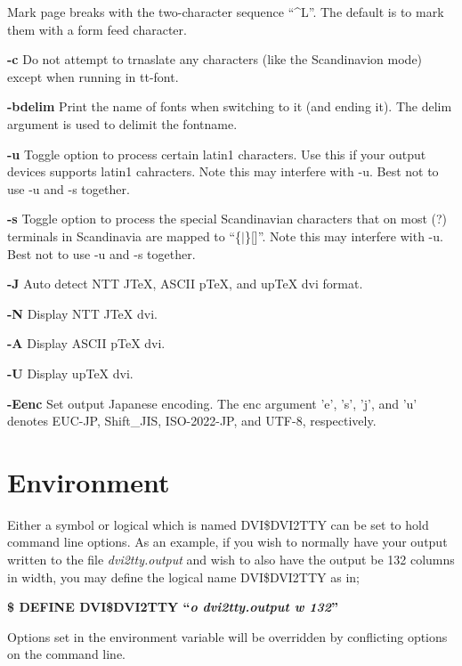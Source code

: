 \begin{list}{}{\setlength{\leftmargin}{0.6in}}
Mark page breaks with the two-character sequence ``\^{}L''. The default is
to mark them with a form feed character.
\item[{{\bf -c}}]
Do not attempt to trnaslate any characters (like the Scandinavion mode)
except when running in tt-font.
\item[{{\bf -bdelim}}]
Print the name of fonts when switching to it (and ending it). The delim
argument is used to delimit the fontname.
\item[{{\bf -u}}]
Toggle option to process certain latin1 characters. Use this if your output
devices supports latin1 cahracters.
Note this may interfere with -u. Best not to use -u and -s together.
\item[{{\bf -s}}]
Toggle option to process the special Scandinavian characters that on most (?)
terminals in Scandinavia are mapped to ``\{$|$\}[\bs ]''.
Note this may interfere with -u. Best not to use -u and -s together.
\item[{{\bf -J}}]
Auto detect NTT JTeX, ASCII pTeX, and upTeX dvi format.
\item[{{\bf -N}}]
Display NTT JTeX dvi.
\item[{{\bf -A}}]
Display ASCII pTeX dvi.
\item[{{\bf -U}}]
Display upTeX dvi.
\item[{{\bf -Eenc}}]
Set output Japanese encoding. The enc argument 'e', 's', 'j', and 'u'
denotes EUC-JP, Shift\_JIS, ISO-2022-JP, and UTF-8, respectively.
\end{list}
%
%
\section*{Environment}
%
%
%
%
Either a symbol or logical which is named DVI\$DVI2TTY can be set to hold
command line options.  As an example,  if you wish to normally have your
output written to the file {\it dvi2tty.output}\/ and wish to also have
the output be 132 columns in width,  you may define the logical name
DVI\$DVI2TTY as in;
\par\vspace{1.0\baselineskip}
\begin{center}
{\bf \$ DEFINE DVI\$DVI2TTY ``{\it o dvi2tty.output w 132}''}
\end{center}
\par\vspace{1.0\baselineskip}
Options set in the environment variable will be overridden by conflicting
options on the command line.
